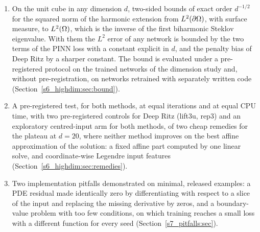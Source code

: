 \begin{enumerate}[label=(C\arabic*),leftmargin=*]
(Sections~\ref{s6_highdim:sec:equal-its}--\ref{s6_highdim:sec:weights}).
\item On the unit cube in any dimension $d$, two-sided bounds of exact order $d^{-1/2}$ for
the squared norm of the harmonic extension from $L^2(\partial\Omega)$, with surface measure, to
$L^2(\Omega)$, which is the inverse of the first biharmonic Steklov eigenvalue. With them the
$L^2$ error of any network is bounded by the two terms of the PINN loss with a constant
explicit in $d$, and the penalty bias of Deep Ritz by a sharper constant. The bound is
evaluated under a pre-registered protocol on the trained networks of the dimension study
and, without pre-registration, on networks retrained with separately written code
(Section~\ref{s6_highdim:sec:bound}).
\item A pre-registered test, for both methods, at equal iterations and at equal CPU time,
with two pre-registered controls for Deep Ritz (lift3u, rep3) and an exploratory centred-input
arm for both methods, of two cheap remedies for the plateau at
$d=20$, where neither method improves on the best affine approximation of the solution: a
fixed affine part computed by one linear solve, and coordinate-wise Legendre input features
(Section~\ref{s6_highdim:sec:remedies}).
\item Two implementation pitfalls demonstrated on minimal, released examples: a PDE
residual made identically zero by differentiating with respect to a slice of the input and
replacing the missing derivative by zeros, and a
boundary-value problem with too few conditions, on which training reaches a small loss with
a different function for every seed (Section~\ref{s7_pitfalls:sec}).
\end{enumerate}

